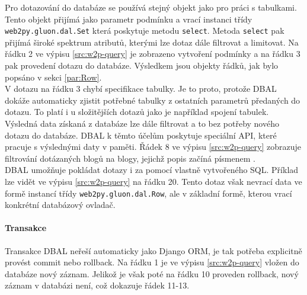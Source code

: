 \documentclass[ing,male,java,dept456]{diploma}						%
\begin{document}
Pro dotazování do databáze se používá stejný objekt jako pro práci s tabulkami. Tento objekt přijímá jako parametr podmínku a vrací instanci třídy \lstinline[style=inlinepython]|web2py.gluon.dal.Set| která poskytuje metodu \lstinline[style=inlinepython]|select|. Metoda \lstinline[style=inlinepython]|select| pak přijímá široké spektrum atributů, kterými lze dotaz dále filtrovat a limitovat. Na řádku 2 ve výpisu \ref{src:w2p-query} je zobrazeno vytvoření podmínky a na řádku 3 pak provedení dotazu do databáze. Výsledkem jsou objekty řádků, jak bylo popsáno v sekci \ref{par:Row}. \\
V dotazu na řádku 3 chybí specifikace tabulky. Je to proto, protože DBAL dokáže automaticky zjistit potřebné tabulky z ostatních parametrů předaných do dotazu. To platí i u složitějších dotazů jako je například spojení tabulek. \\
Výsledná data získaná z databáze lze dále filtrovat a to bez potřeby nového dotazu do databáze. DBAL k těmto účelům poskytuje speciální API, které pracuje s výslednými daty v paměti. Řádek 8 ve výpisu \ref{src:w2p-query} zobrazuje filtrování dotázaných blogů na blogy, jejichž popis začíná písmenem . \\
DBAL umožňuje pokládat dotazy i za pomocí vlastně vytvořeného SQL. Příklad lze vidět ve výpisu \ref{src:w2p-query} na řádku 20. Tento dotaz však nevrací data ve formě instancí třídy \lstinline[style=inlinepython]|web2py.gluon.dal.Row|, ale v základní formě, kterou vrací konkrétní databázový ovladač. \\

\paragraph{Transakce} 
Transakce DBAL neřeší automaticky jako Django ORM, je tak potřeba explicitně provést commit nebo rollback. Na řádku 1 je ve výpisu \ref{src:w2p-query} vložen do databáze nový záznam. Jelikož je však poté na řádku 10 proveden rollback, nový záznam v databázi není, což dokazuje řádek 11-13.
\end{document}
